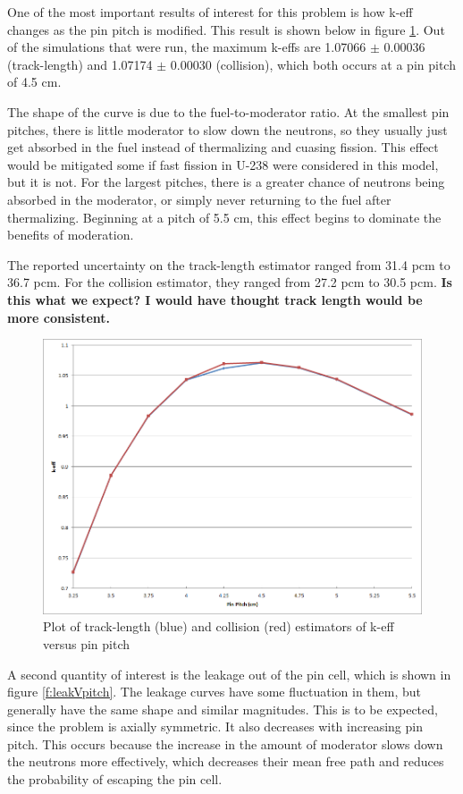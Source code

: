 One of the most important results of interest for this problem is how k-eff changes as the pin pitch is modified.  This result is shown below in figure \ref{f:keffVpitch}.  Out of the simulations that were run, the maximum k-effs are 1.07066 $\pm$ 0.00036 (track-length) and 1.07174 $\pm$ 0.00030 (collision), which both occurs at a pin pitch of 4.5 cm.

The shape of the curve is due to the fuel-to-moderator ratio.  At the smallest pin pitches, there is little moderator to slow down the neutrons, so they usually just get absorbed in the fuel instead of thermalizing and cuasing fission.  This effect would be mitigated some if fast fission in U-238 were considered in this model, but it is not.  For the largest pitches, there is a greater chance of neutrons being absorbed in the moderator, or simply never returning to the fuel after thermalizing.  Beginning at a pitch of 5.5 cm, this effect begins to dominate the benefits of moderation.

The reported uncertainty on the track-length estimator ranged from 31.4 pcm to 36.7 pcm.  For the collision estimator, they ranged from 27.2 pcm to 30.5 pcm.  \textbf{Is this what we expect?  I would have thought track length would be more consistent.}

\begin{figure}[H]
\centering
\includegraphics[width=0.8\linewidth]{images/keff_v_pitch.png}
\caption{Plot of track-length (blue) and collision (red) estimators of k-eff versus pin pitch}
\label{f:keffVpitch}
\end{figure}

A second quantity of interest is the leakage out of the pin cell, which is shown in figure \ref{f:leakVpitch}.  The leakage curves have some fluctuation in them, but generally have the same shape and similar magnitudes.  This is to be expected, since the problem is axially symmetric.  It also decreases with increasing pin pitch.  This occurs because the increase in the amount of moderator slows down the neutrons more effectively, which decreases their mean free path and reduces the probability of escaping the pin cell.

